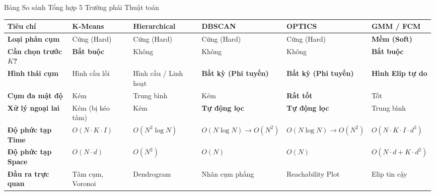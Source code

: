 \documentclass[aspectratio=169,10pt]{beamer}
\begin{document}
\begin{frame}{Bảng So sánh Tổng hợp 5 Trường phái Thuật toán}
  \begin{table}[]
    \tiny
    \centering
    \begin{tabularx}{\textwidth}{l *{5}{>{\raggedright\arraybackslash}X}}
      \toprule
      \textbf{Tiêu chí} & \textbf{K-Means} & \textbf{Hierarchical} & \textbf{DBSCAN} & \textbf{OPTICS} & \textbf{GMM / FCM} \\
      \midrule
      \textbf{Loại phân cụm} & Cứng (Hard) & Cứng (Hard) & Cứng (Hard) & Cứng (Hard) & \textbf{Mềm (Soft)} \\
      \textbf{Cần chọn trước $K$?} & \textbf{Bắt buộc} & Không & Không & Không & \textbf{Bắt buộc} \\
      \textbf{Hình thái cụm} & Hình cầu lồi & Hình cầu / Linh hoạt & \textbf{Bất kỳ (Phi tuyến)} & \textbf{Bất kỳ (Phi tuyến)} & \textbf{Hình Elip tự do} \\
      \textbf{Cụm đa mật độ} & Kém & Trung bình & Kém & \textbf{Rất tốt} & Tốt \\
      \textbf{Xử lý ngoại lai} & Kém (bị kéo tâm) & Kém & \textbf{Tự động lọc} & \textbf{Tự động lọc} & Trung bình \\
      \textbf{Độ phức tạp Time} & $O(N \cdot K \cdot I)$ & $O(N^2 \log N)$ & $O(N \log N) \to O(N^2)$ & $O(N \log N) \to O(N^2)$ & $O(N \cdot K \cdot I \cdot d^3)$ \\
      \textbf{Độ phức tạp Space} & $O(N \cdot d)$ & $O(N^2)$ & $O(N)$ & $O(N)$ & $O(N \cdot d + K \cdot d^2)$ \\
      \textbf{Đầu ra trực quan} & Tâm cụm, Voronoi & Dendrogram & Nhãn cụm phẳng & Reachability Plot & Elip tin cậy \\
      \bottomrule
    \end{tabularx}
  \end{table}
\end{frame}
\end{document}
